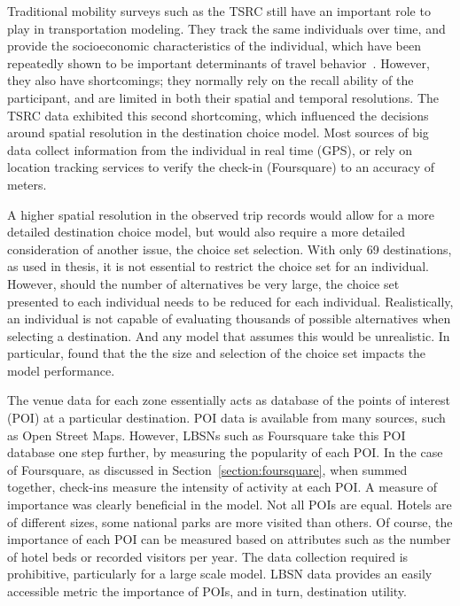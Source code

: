 Traditional mobility surveys such as the TSRC still have an important role to play in transportation modeling. They track the same individuals over time, and provide the socioeconomic characteristics of the individual, which have been repeatedly shown to be important determinants of travel behavior~\parencite{pas1984effect,hanson1982determinants}. However, they also have shortcomings; they normally rely on the recall ability of the participant, and are limited in both their spatial and temporal resolutions. The TSRC data exhibited this second shortcoming, which influenced the decisions around spatial resolution in the destination choice model. Most sources of big data collect information from the individual in real time (GPS), or rely on location tracking services to verify the check-in (Foursquare) to an accuracy of meters.


A higher spatial resolution in the observed trip records would allow for a more detailed destination choice model, but would also require a more detailed consideration of another issue, the choice set selection. With only 69 destinations, as used in thesis, it is not essential to restrict the choice set for an individual. However, should the number of alternatives be very large, the choice set presented to each individual needs to be reduced for each individual. Realistically, an individual is not capable of evaluating thousands of possible alternatives when selecting a destination. And any model that assumes this would be unrealistic. In particular, \textcite{AkivaLerman85} found that the the size and selection of the choice set impacts the model performance.

The venue data for each zone essentially acts as database of the points of interest (POI) at a particular destination. POI data is available from many sources, such as Open Street Maps. However, LBSNs such as Foursquare take this POI database one step further, by measuring the popularity of each POI. In the case of Foursquare, as discussed in Section~\ref{section:foursquare}, when summed together, check-ins measure the intensity of activity at each POI. A measure of importance was clearly beneficial in the model. Not all POIs are equal. Hotels are of different sizes, some national parks are more visited than others. Of course, the importance of each POI can be measured based on attributes such as the number of hotel beds or recorded visitors per year. The data collection required is prohibitive, particularly for a large scale model. LBSN data provides an easily accessible metric the importance of POIs, and in turn, destination utility. 


